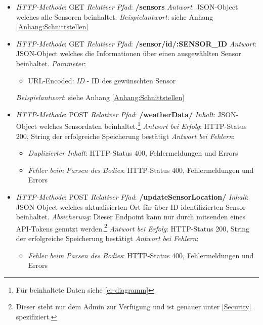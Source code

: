 \begin{itemize}
    \item \textsl{HTTP-Methode}: GET
    \subitem \textsl{Relativer Pfad}: \textbf{/sensors}
    \subitem \textsl{Antwort}: JSON-Object welches alle Sensoren beinhaltet.
    \subitem \textsl{Beispielantwort}: siehe Anhang \ref{Anhang:Schnittstellen}
\end{itemize}

\begin{itemize}
    \item \textsl{HTTP-Methode}: GET
    \subitem \textsl{Relativer Pfad}: \textbf{/sensor/id/:SENSOR\_ID}
    \subitem \textsl{Antwort}: JSON-Object welches die Informationen über einen ausgewählten Sensor beinhaltet.
    \subitem \textsl{Parameter}: \begin{itemize}
                                     \item URL-Encoded: \textit{ID} - ID des gewünschten Sensor
    \end{itemize}
    \subitem \textsl{Beispielantwort}: siehe Anhang \ref{Anhang:Schnittstellen}
\end{itemize}

\begin{itemize}
    \item \textsl{HTTP-Methode}: POST
    \subitem \textsl{Relativer Pfad}: \textbf{/weatherData/}
    \subitem \textsl{Inhalt}: JSON-Object welches Sensordaten beinhaltet.\footnote{Für beinhaltete Daten siehe \cref{er-diagramm}}
    \subitem \textsl{Antwort bei Erfolg}: HTTP-Status 200, String der erfolgreiche Speicherung bestätigt
    \subitem \textsl{Antwort bei Fehlern}:\begin{itemize}
                                              \item \textit{Duplizierter Inhalt}: HTTP-Status 400, Fehlermeldungen und Errors
                                              \item \textit{Fehler beim Parsen des Bodies}: HTTP-Status 400, Fehlermeldungen und Errors
    \end{itemize}
\end{itemize}

\begin{itemize}
    \item \textsl{HTTP-Methode}: POST
    \subitem \textsl{Relativer Pfad}: \textbf{/updateSensorLocation/}
    \subitem \textsl{Inhalt}: JSON-Object welches aktualisierten Ort für über ID identifizierten Sensor beinhaltet.
    \subitem \textsl{Absicherung}: Dieser Endpoint kann nur durch mitsenden eines API-Tokens genutzt werden.\footnote{Dieser steht nur dem Admin zur Verfügung und ist genauer unter \cref{Security} spezifiziert.}
    \subitem \textsl{Antwort bei Erfolg}: HTTP-Status 200, String der erfolgreiche Speicherung bestätigt
    \subitem \textsl{Antwort bei Fehlern}:\begin{itemize}
                                              \item \textit{Fehler beim Parsen des Bodies}: HTTP-Status 400, Fehlermeldungen und Errors
    \end{itemize}
\end{itemize}


